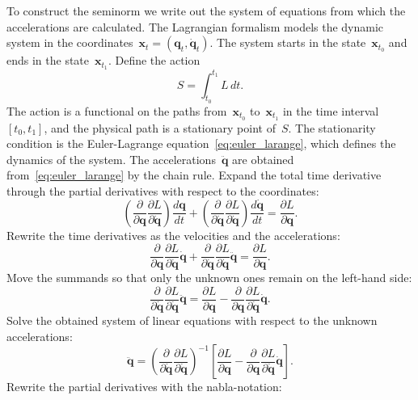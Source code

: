 \documentclass[sn-mathphys-num]{sn-jnl}
\theoremstyle{thmstylethree}
\theoremstyle{thmstyletwo}
\theoremstyle{thmstyleone}
\begin{document}
To construct the seminorm we write out the system of equations from which the accelerations are calculated. The Lagrangian formalism models the dynamic system in the coordinates~$\mathbf{x}_t = (\mathbf{q}_t, \dot{\mathbf{q}}_t)$. The system starts in the state~$\mathbf{x}_{t_0}$ and ends in the state~$\mathbf{x}_{t_1}$. Define the action
\[ %
S=\int_{t_{0}}^{t_{1}} L \, d t.
\]%
The action is a functional on the paths from~$\mathbf{x}_{t_0}$ to~$\mathbf{x}_{t_1}$ in the time interval $[t_0, t_1]$, and the physical path is a stationary point of~$S$. %
The stationarity condition is the Euler-Lagrange equation~\eqref{eq:euler_larange}, which defines the dynamics of the system.
The accelerations~$\ddot{\mathbf{q}}$ are obtained from~\eqref{eq:euler_larange} by the chain rule. Expand the total time derivative through the partial derivatives with respect to the coordinates:
\[
\left(\frac{\partial}{\partial \mathbf{q}} \frac{\partial L}{\partial \dot{\mathbf{q}}} \right) \frac{d \mathbf{q}}{d t}+\left(\frac{\partial}{\partial \dot{\mathbf{q}}} \frac{\partial L}{\partial \dot{\mathbf{q}}} \right)  \frac{d \dot{\mathbf{q}}}{d t}
= \frac{\partial L}{\partial \mathbf{q}}.
\]
Rewrite the time derivatives as the velocities and the accelerations:
\[
\frac{\partial}{\partial \mathbf{q}} \frac{\partial L}{\partial \dot{\mathbf{q}}} \dot{\mathbf{q}}+\frac{\partial}{\partial \dot{\mathbf{q}}} \frac{\partial L}{\partial \dot{\mathbf{q}}} \ddot{\mathbf{q}}
= \frac{\partial L}{\partial \mathbf{q}}.
\]
Move the summands so that only the unknown ones remain on the left-hand side:
\[
\frac{\partial}{\partial \dot{\mathbf{q}}} \frac{\partial L}{\partial \dot{\mathbf{q}}} \ddot{\mathbf{q}} 
= \frac{\partial L}{\partial \mathbf{q}}-\frac{\partial}{\partial \mathbf{q}} \frac{\partial L}{\partial \dot{\mathbf{q}}} \dot{\mathbf{q}}.
\]
Solve the obtained system of linear equations with respect to the unknown accelerations:
\[
\ddot{\mathbf{q}}
= \left(\frac{\partial}{\partial \dot{\mathbf{q}}} \frac{\partial L}{\partial \dot{\mathbf{q}}}\right)^{-1}\left[\frac{\partial L}{\partial \mathbf{q}}-\frac{\partial}{\partial \mathbf{q}} \frac{\partial L}{\partial \dot{\mathbf{q}}} \dot{\mathbf{q}}\right].
\]
Rewrite the partial derivatives with the nabla-notation:
\end{document}
